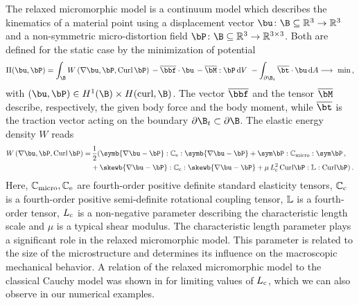 \label{sec:model} 

The relaxed micromorphic model is a continuum model which describes the kinematics of a material point using a displacement vector $\bu\colon\B\subseteq\R^3\to\R^3$ and a non-symmetric micro-distortion field  $\Bdis\colon\B\subseteq\R^3\to\R^{3\times3}$. Both are defined  for the static case by the minimization of potential
\begin{equation}
\label{eq:pot}
\Pi (\bu,\Bdis) = \int_\B W\left(\nabla \bu,\Bdis,\Curl \Bdis \right) \, - \overline{\bbf}\cdot{\bu} \, - \overline{\bM} : \Bdis \,\textrm{d}V\ - \int_{\partial \B_t} \overline{\bt} \cdot \bu  \,\textrm{d}A  \longrightarrow\ \min\,,
\end{equation}
with $(\bu,\Bdis)\in H^1(\B)\times H(\curl,\B)$. The vector $\overline\bbf$ and the tensor $\overline{\bM}$ describe, respectively, the given body force and the body moment, while $\overline\bt$ is the traction vector acting on the boundary $\partial \B_t \subset \partial \B$. The elastic energy density $W$ reads  
\begin{equation}
\begin{aligned}
W\left(\nabla \bu,\Bdis,\Curl \Bdis \right) =& \, \dfrac{1}{2} ( \symb{ \nabla \bu - \Bdis} : \Ce : \symb{ \nabla \bu - \Bdis} +   \sym \Bdis : \Cmicro: \sym \Bdis  \,, \\
&+ \skewb{ \nabla \bu - \Bdis} : \Cc : \skewb{ \nabla \bu - \Bdis} +   \mu \, \Lc^2 \, \textrm{Curl} \Bdis : \IL :\textrm{Curl} \Bdis ) \,. \\
\end{aligned}
\end{equation}
Here, $\mathbb{C}_{\mathrm{micro}},\mathbb{C}_{\mathrm{e}}$ are fourth-order positive definite standard elasticity tensors, $\mathbb{C}_{\mathrm{c}}$ is a fourth-order positive semi-definite rotational coupling tensor, $\mathbb{L}$ is a fourth-order tensor, $L_{\mathrm{c}}$ is a non-negative parameter describing the characteristic length scale and $\mu$ is a typical shear modulus.  The characteristic length parameter plays a significant role in the relaxed micromorphic model. This parameter is related to the size of the microstructure  and determines its influence on the macroscopic mechanical behavior. A relation of the relaxed micromorphic model to the classical Cauchy model was shown in \cite{NefEidMad:2019:ios} for limiting values of $L_{\mathrm{c}}$, which we can also observe in our numerical examples. 


